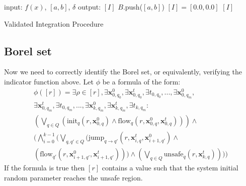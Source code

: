 \begin{algorithm}
\label{alg:integration}
input: $f(x)$, $[a, b]$, $\delta$\;
output: $[I]$\;
$B$.push($[a, b]$)\;
$[I] = [0.0, 0.0]$\;
\Return $[I]$\;
\caption{Validated Integration Procedure}
\end{algorithm}

\subsection{Borel set}
Now we need to correctly identify the Borel set, or equivalently, verifying the indicator function
above. Let $\phi$ be a formula of the form:
\begin{equation} \label{eq:phi}
\begin{split}
\phi([r]) = \exists \rho \in [r], \exists \textbf{x}^{0}_{0,q_0}, \exists \textbf{x}^{t}_{0,q_0}, \exists t_{0, q_0}, ... , \exists \textbf{x}^{0}_{0,q_m}, \\ \exists \textbf{x}^{t}_{0,q_m}, \exists t_{0, q_m}, ... , \exists \textbf{x}^{0}_{k,q_m}, \exists \textbf{x}^t_{k,q_m}, \exists t_{k, q_m}:\\
(\bigvee_{q \in Q} (\text{init}_{q}(r, \textbf{x}^{0}_{0,q}) \wedge \text{flow}_{q}(r, \textbf{x}^{0}_{0,q}, \textbf{x}^{t}_{0,q}))) \wedge \\
(\bigwedge_{i=0}^{k-1} (\bigvee_{q,q' \in Q}(\text{jump}_{q \rightarrow q'}(r, \textbf{x}^{t}_{i,q}, \textbf{x}^{0}_{i+1,q'}) \wedge \\
(\text{flow}_{q'}(r, \textbf{x}^{0}_{i+1,q'}, \textbf{x}^{t}_{i+1,q'}))) \wedge (\bigvee_{q \in Q} \text{unsafe}_{q}(r, \textbf{x}^{t}_{k,q}))))
\end{split}
\end{equation}
If the formula is true then $[r]$ contains a value such that the system initial random parameter 
reaches the unsafe region.

